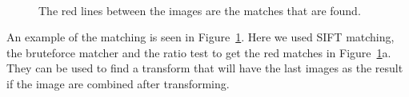 \begin{figure}[!ht]
	\centering
	 \quad 
	\\
	 \quad
	\caption{The red lines between the images are the matches that are found.}
	\label{fig:bus}
\end{figure}

An example of the matching is seen in Figure~\ref{fig:bus}. Here we used SIFT matching, the bruteforce matcher and the ratio test to get the red matches in Figure~\ref{fig:bus}a.  They can be used to find a transform that will have the last images as the result if the image are combined after transforming.
